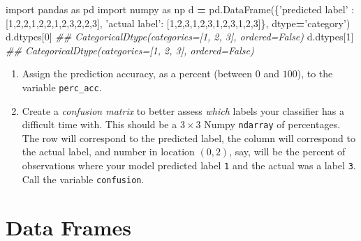 \documentclass[12pt,krantz2]{krantz}
\makeatletter
\newenvironment{Shaded}{\begin{snugshade}}{\end{snugshade}}
\newcommand{\CommentTok}[1]{\textcolor[rgb]{0.37,0.37,0.37}{\textit{#1}}}
\newcommand{\DecValTok}[1]{\textcolor[rgb]{0.06,0.06,0.06}{#1}}
\newcommand{\ImportTok}[1]{#1}
\newcommand{\NormalTok}[1]{#1}
\newcommand{\OperatorTok}[1]{\textcolor[rgb]{0.43,0.43,0.43}{\textbf{#1}}}
\newcommand{\StringTok}[1]{\textcolor[rgb]{0.5,0.5,0.5}{#1}}
\providecommand{\tightlist}{%
  \setlength{\itemsep}{0pt}\setlength{\parskip}{0pt}}
\newenvironment{kframe}{%
\medskip{}
\setlength{\fboxsep}{.8em}
 \def\at@end@of@kframe{}%
 \ifinner\ifhmode%
  \def\at@end@of@kframe{\end{minipage}}%
  \begin{minipage}{\columnwidth}%
 \fi\fi%
 \def\FrameCommand##1{\hskip\@totalleftmargin \hskip-\fboxsep
 \colorbox{shadecolor}{##1}\hskip-\fboxsep
     \hskip-\linewidth \hskip-\@totalleftmargin \hskip\columnwidth}%
 \MakeFramed {\advance\hsize-\width
   \@totalleftmargin\z@ \linewidth\hsize
   \@setminipage}}%
 {\par\unskip\endMakeFramed%
 \at@end@of@kframe}
\renewenvironment{Shaded}{\begin{kframe}}{\end{kframe}}
\makeatother
\begin{document}
\begin{Shaded}
\begin{Highlighting}[]
\ImportTok{import}\NormalTok{ pandas }\ImportTok{as}\NormalTok{ pd}
\ImportTok{import}\NormalTok{ numpy }\ImportTok{as}\NormalTok{ np}
\NormalTok{d }\OperatorTok{=}\NormalTok{ pd.DataFrame(\{}\StringTok{'predicted label'}\NormalTok{ : [}\DecValTok{1}\NormalTok{,}\DecValTok{2}\NormalTok{,}\DecValTok{2}\NormalTok{,}\DecValTok{1}\NormalTok{,}\DecValTok{2}\NormalTok{,}\DecValTok{2}\NormalTok{,}\DecValTok{1}\NormalTok{,}\DecValTok{2}\NormalTok{,}\DecValTok{3}\NormalTok{,}\DecValTok{2}\NormalTok{,}\DecValTok{2}\NormalTok{,}\DecValTok{3}\NormalTok{], }
                  \StringTok{'actual label'}\NormalTok{: [}\DecValTok{1}\NormalTok{,}\DecValTok{2}\NormalTok{,}\DecValTok{3}\NormalTok{,}\DecValTok{1}\NormalTok{,}\DecValTok{2}\NormalTok{,}\DecValTok{3}\NormalTok{,}\DecValTok{1}\NormalTok{,}\DecValTok{2}\NormalTok{,}\DecValTok{3}\NormalTok{,}\DecValTok{1}\NormalTok{,}\DecValTok{2}\NormalTok{,}\DecValTok{3}\NormalTok{]\}, }
\NormalTok{                  dtype}\OperatorTok{=}\StringTok{'category'}\NormalTok{)}
\NormalTok{d.dtypes[}\DecValTok{0}\NormalTok{]}
\CommentTok{## CategoricalDtype(categories=[1, 2, 3], ordered=False)}
\NormalTok{d.dtypes[}\DecValTok{1}\NormalTok{]}
\CommentTok{## CategoricalDtype(categories=[1, 2, 3], ordered=False)}
\end{Highlighting}
\end{Shaded}

\begin{enumerate}
\def\labelenumi{\alph{enumi})}
\tightlist
\item
  Assign the prediction accuracy, as a percent (between \(0\) and \(100\)), to the variable \texttt{perc\_acc}.
\item
  Create a \emph{confusion matrix} to better assess \emph{which} labels your classifier has a difficult time with. This should be a \(3 \times 3\) Numpy \texttt{ndarray} of percentages. The row will correspond to the predicted label, the column will correspond to the actual label, and number in location \((0,2)\), say, will be the percent of observations where your model predicted label \texttt{1} and the actual was a label \texttt{3}. Call the variable \texttt{confusion}.
\end{enumerate}

\hypertarget{data-frames}{%
\chapter{Data Frames}\label{data-frames}}
\end{document}
